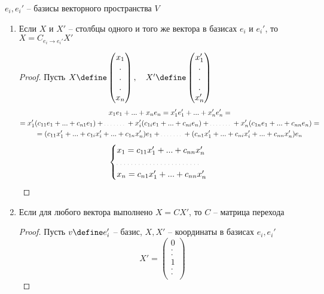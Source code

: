 \begin{properties}
	$ e_i, e_i' $ -- базисы векторного пространства $ V $
	\begin{enumerate}
		\item Если $ X $ и $ X' $ -- столбцы одного и того же вектора в базисах $ e_i $ и $ e_i' $, то $ X = C_{e_i \to e_i'}X' $
		\begin{proof}
			Пусть $ X \define
			\begin{pmatrix}
				x_1 \\
				. \\
				. \\
				. \\
				x_n
			\end{pmatrix}, \quad X' \define
			\begin{pmatrix}
				x_1' \\
				. \\
				. \\
				. \\
				x_n'
			\end{pmatrix} $
			\begin{multline*}
				x_1e_1 + ... + x_ne_n = x_1'e_1' + ... + x_n'e_n' = \\ = x_1'(c_{11}e_1 + ... + c_{n1}e_1) + \widedots[3em] + x_i'(c_{1i}e_1 + ... + c_{ni}e_n) + \widedots[3em] + x_n'(c_{1n}e_1 + ... + c_{nn}e_n) = \\ = (c_{11}x_1' + ... + c_{1i}x_i' + ... + c_{1n}x_n')e_1 + \widedots[3em] + (c_{n1}x_1' + ... + c_{ni}x_i' + ... + c_{nn}x_n')e_n
			\end{multline*}
			$$
			\begin{cases}
				x_1 = c_{11}x_1' + ... + c_{nn}x_n' \\
				\widedots[10em] \\
				x_n = c_{n1}x_1' + ... + c_{nn}x_n'
			\end{cases} $$
		\end{proof}
		\item Если для любого вектора выполнено $ X = CX' $, то $ C $ -- матрица перехода
		\begin{proof}
			Пусть $ v \define e_i' $ -- базис, $ X, X' $ -- координаты в базисах $ e_i, e_i' $
			$$ X' =
			\begin{pmatrix}
				0 \\
				. \\
				. \\
				1 \\
				. \\
				. \\

\end{pmatrix}$$
\end{proof}
\end{enumerate}
\end{properties}
